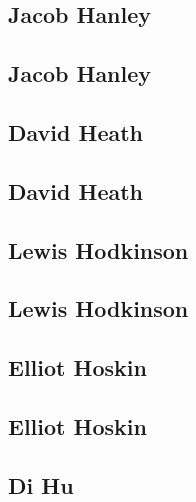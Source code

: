 \documentclass[twoside,14pt,a4paper,notitlepage]{memoir}
\begin{document}
\subsection*{Jacob Hanley}
\label{aut:hanley}

\lipsum[1-2]
\subsection*{Jacob Hanley}
\lipsum[3]



\subsection*{David Heath}
\label{aut:heath}

\lipsum[1-2]
\subsection*{David Heath}
\lipsum[3]



\subsection*{Lewis Hodkinson}
\label{aut:hodkinson}

\lipsum[1-2]
\subsection*{Lewis Hodkinson}
\lipsum[3]



\subsection*{Elliot Hoskin}
\label{aut:hoskin}

\lipsum[1-2]
\subsection*{Elliot Hoskin}
\lipsum[3]



\subsection*{Di Hu}
\label{aut:hu}
\end{document}
